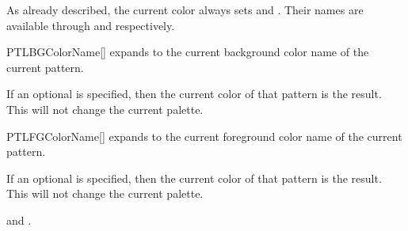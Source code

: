 \documentclass[a4paper, 11pt]{article}
\begin{document}
\begin{tcblisting}{}


\end{tcblisting}


As already described, the current color always sets  and . Their names are available through  and  respectively.

\begin{macro}{PTLBGColorName}[]
     expands to the current background color name of the current pattern.

    If an optional  is specified, then the current color of that pattern is the result. This will not change the current palette.
\end{macro}

\begin{macro}{PTLFGColorName}[]
     expands to the current foreground color name of the current pattern.

    If an optional  is specified, then the current color of that pattern is the result. This will not change the current palette.
\end{macro}

\begin{tcblisting}{}

    \begin{center}
        \forcsvlist{%
            \textcolor{PLTBGColor}{\textbf{\PLTBGColorName}}, %
            \PLTNextColor%
        }{{}, {}, {}, {}, {}, {}}%
        and \textcolor{PLTBGColor}{\textbf{\PLTBGColorName}}.

        \medskip
        \PLTResetLoop
        \forcsvlist{%
            \textcolor{PLTBGColor}{\rule{1.15cm}{1em}}%
            \PLTNextColor%
        }{{}, {}, {}, {}, {}, {}, {}}%
    \end{center}
\end{tcblisting}
\end{document}
